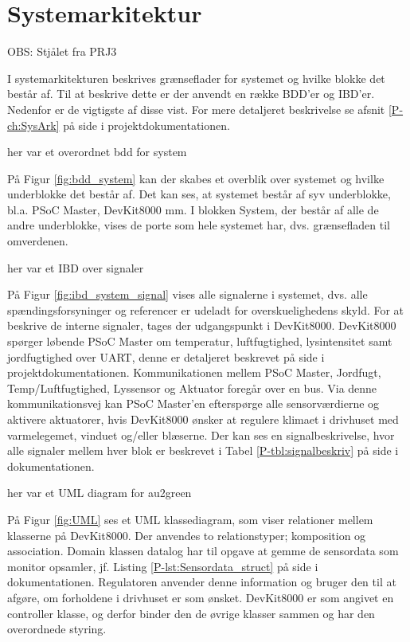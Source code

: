 \section{Systemarkitektur}
\label{ch:Systemarkitektur}

OBS: Stjålet fra PRJ3

I systemarkitekturen beskrives grænseflader for systemet og hvilke blokke det består af. Til at beskrive dette er der anvendt en række BDD'er og IBD'er. Nedenfor er de vigtigste af disse vist. For mere detaljeret beskrivelse se afsnit \ref{P-ch:SysArk}  på side \pageref{P-ch:SysArk} i projektdokumentationen.

her var et overordnet bdd for system


På Figur \ref{fig:bdd_system} kan der skabes et overblik over systemet og hvilke underblokke det består af. Det kan ses, at systemet består af syv underblokke, bl.a. PSoC Master, DevKit8000 mm. I blokken System, der består af alle de andre underblokke, vises de porte som hele systemet har, dvs. grænsefladen til omverdenen.

\clearpage

her var et IBD over signaler

På Figur \ref{fig:ibd_system_signal} vises alle signalerne i systemet, dvs. alle spændingsforsyninger og referencer er udeladt for overskuelighedens skyld. For at beskrive de interne signaler, tages der udgangspunkt i DevKit8000. DevKit8000 spørger løbende PSoC Master om temperatur, luftfugtighed, lysintensitet samt jordfugtighed over UART, denne er detaljeret beskrevet på side \pageref{P-sec:UART_protokol} i projektdokumentationen. Kommunikationen mellem PSoC Master, Jordfugt, Temp/Luftfugtighed, Lyssensor og Aktuator foregår over en \IIC bus. Via denne kommunikationsvej kan PSoC Master'en efterspørge alle sensorværdierne og aktivere aktuatorer, hvis DevKit8000 ønsker at regulere klimaet i drivhuset med varmelegemet, vinduet og/eller blæserne. Der kan ses en signalbeskrivelse, hvor alle signaler mellem hver blok er beskrevet i Tabel \ref{P-tbl:signalbeskriv} på side \pageref{P-tbl:signalbeskriv} i dokumentationen.

\clearpage

her var et UML diagram for au2green

På Figur \ref{fig:UML} ses et UML klassediagram, som viser relationer mellem klasserne på DevKit8000. Der anvendes to relationstyper; komposition og association. Domain klassen datalog har til opgave at gemme de sensordata som monitor opsamler, jf. Listing \ref{P-lst:Sensordata_struct} på side \pageref{P-lst:Sensordata_struct} i dokumentationen. Regulatoren anvender denne information og bruger den til at afgøre, om forholdene i drivhuset er som ønsket. DevKit8000 er som angivet en controller klasse, og derfor binder den de øvrige klasser sammen og har den overordnede styring.

